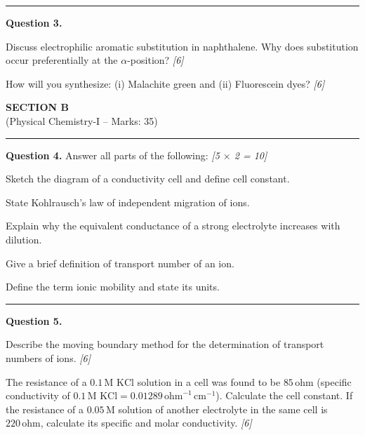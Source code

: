 \documentclass[11pt,a4paper]{article}
\newcommand{\pts}[1]{\hfill   \textit{[#1]}}
\begin{document}
\medskip\rule{\linewidth}{0.2pt}




\noindent   \textbf{Question 3.}

\begin{parts}
  \item Discuss electrophilic aromatic substitution in naphthalene. Why does substitution occur preferentially at the $\alpha$-position? \pts{6}
  \item How will you synthesize: (i) Malachite green and (ii) Fluorescein dyes? \pts{6}
\end{parts}


\newpage

\begin{center}
  {\large\bfseries SECTION B}\\[2pt]
  {\normalsize (Physical Chemistry-I -- Marks: 35)}
\end{center}
\rule{0.4\linewidth}{0.2pt}
\smallskip




\noindent   \textbf{Question 4.} Answer all parts of the following: \pts{5 $ \times$ 2 = 10}

\begin{parts}
  \item Sketch the diagram of a conductivity cell and define cell constant.
  \item State Kohlrausch's law of independent migration of ions.
  \item Explain why the equivalent conductance of a strong electrolyte increases with dilution.
  \item Give a brief definition of transport number of an ion.
  \item Define the term ionic mobility and state its units.
\end{parts}

\medskip\rule{\linewidth}{0.2pt}




\noindent   \textbf{Question 5.}

\begin{parts}
  \item Describe the moving boundary method for the determination of transport numbers of ions. \pts{6}
  \item The resistance of a $0.1\, \text{M}$ $ \text{KCl}$ solution in a cell was found to be $85\, \text{ohm}$ (specific conductivity of $0.1\, \text{M}$ $ \text{KCl} = 0.01289\, \text{ohm}^{-1}\, \text{cm}^{-1}$). Calculate the cell constant. If the resistance of a $0.05\, \text{M}$ solution of another electrolyte in the same cell is $220\, \text{ohm}$, calculate its specific and molar conductivity. \pts{6}
\end{parts}
\end{document}
